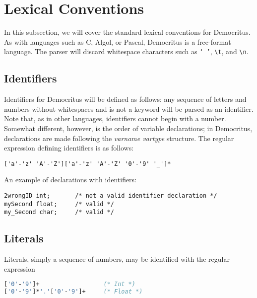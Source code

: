 \section{Lexical Conventions}
	In this subsection, we will cover the standard lexical conventions for Democritus. As with languages such as C, Algol, or Pascal, Democritus is a free-format language. The parser will discard whitespace characters such as \texttt{` '}, \verb|\t|, and \verb|\n|.
	
	\subsection{Identifiers}
		Identifiers for Democritus will be defined as follows: any sequence of letters and numbers without whitespaces and is not a keyword will be parsed as an identifier. Note that, as in other languages, identifiers cannot begin with a number. Somewhat different, however, is the order of variable declarations; in Democritus, declarations are made following the \textit{varname vartype} structure. The regular expression defining identifiers is as follows:
		
	\begin{lstlisting}
['a'-'z' 'A'-'Z']['a'-'z' 'A'-'Z' '0'-'9' '_']*
	\end{lstlisting}
	
	\noindent An example of declarations with identifiers: 
	
	\begin{lstlisting}
2wrongID int;		/* not a valid identifier declaration */
mySecond float;		/* valid */
my_Second char;		/* valid */
	\end{lstlisting}
	
	\subsection{Literals}
		Literals, simply a sequence of numbers, may be identified with the regular expression
	\begin{lstlisting}[language=Caml]
['0'-'9']+ 					(* Int *)
['0'-'9']*'.'['0'-'9']+  	(* Float *)
	\end{lstlisting}
	
